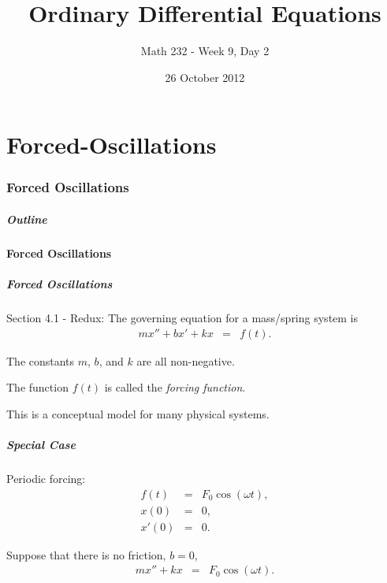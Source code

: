 \part{Forced-Oscillations}
\section{Forced Oscillations}

\title{Ordinary Differential Equations}
\subtitle{Math 232 - Week 9, Day 2}
\date{26 October 2012}

\begin{frame}
  \titlepage
\end{frame}

\begin{frame}
  \frametitle{Outline}
\end{frame}


\subsection{Forced Oscillations}


\begin{frame}
  \frametitle{Forced Oscillations}

  Section 4.1 - Redux: The governing equation for a mass/spring system
  is
  \begin{eqnarray*}
    mx'' + bx'+kx & = & f(t).
  \end{eqnarray*}

  The constants $m$, $b$, and $k$ are all non-negative.

  The function $f(t)$ is called the \textit{forcing function}.

  This is a conceptual model for many physical systems.

\end{frame}


\begin{frame}
  \frametitle{Special Case}

  Periodic forcing:
  \begin{eqnarray*}
    f(t) & = & F_0 \cos(\omega t), \\
    x(0) & = & 0, \\
    x'(0) & = & 0.
  \end{eqnarray*}

  Suppose that there is no friction, $b=0$,
  \begin{eqnarray*}
    m x'' + kx & = & F_0 \cos(\omega t).
  \end{eqnarray*}

\end{frame}


